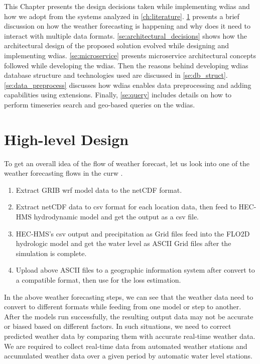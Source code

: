 This Chapter presents the design decisions taken while implementing \acrfull{wdias} and how we adopt from the systems analyzed in \cref{ch:literature}.
\cref{se:high_level_design} presents a brief discussion on how  the weather forecasting is happening and why does it need to interact with multiple data formats.
\cref{se:architectural_decisions} shows how the architectural design of the proposed solution evolved while designing and implementing \acrshort{wdias}.
\cref{se:microservice} presents microservice architectural concepts followed while developing the \acrshort{wdias}. Then the reasons behind developing \acrshort{wdias} database structure and technologies used are discussed in  \cref{se:db_struct}.
\cref{se:data_preprocess} discusses how \acrshort{wdias} enables data preprocessing and adding capabilities using extensions. Finally, \cref{se:query} includes details on how to perform timeseries search and geo-based queries on the \acrshort{wdias}.


\section{High-level Design}
\label{se:high_level_design}

To get an overall idea of the flow of weather forecast, let us look into one of the weather forecasting flows in the \acrshort{curw} \cite{CUrWSL2017SL}.

\begin{enumerate}
    \item Extract \acrshort{GRIB} \acrshort{wrf} model data to the \acrshort{netCDF} format.
    \item Extract \acrshort{netCDF} data to \acrshort{csv} format for each location data, then feed to HEC-HMS hydrodynamic model and get the output as a \acrshort{csv} file.
    \item HEC-HMS's \acrshort{csv} output and precipitation as Grid files feed into the FLO2D hydrologic model and get the water level as ASCII Grid files after the simulation is complete.
    \item Upload above ASCII files to a geographic information system after convert to a compatible format, then use for the loss estimation.
\end{enumerate}
    
In the above weather forecasting steps, we can see that the weather data need to convert to different formats while feeding from one model or step to another. After the models run successfully, the resulting output data may not be accurate or biased based on different factors. In such situations, we need to correct predicted weather data by comparing them with accurate real-time weather data. We are required to collect real-time data from automated weather stations and accumulated weather data over a given period by automatic water level stations.

